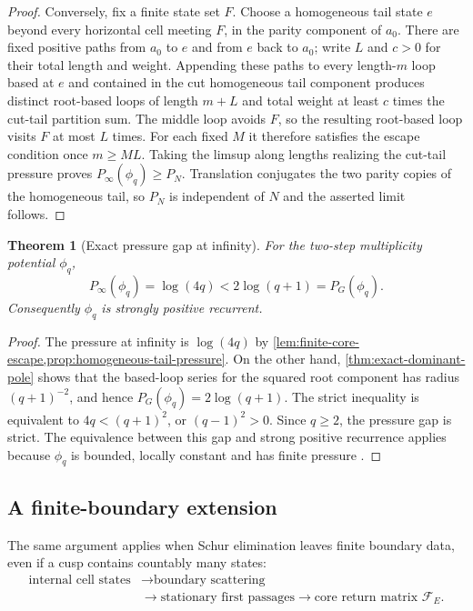\documentclass[11pt,reqno]{amsart}
\numberwithin{equation}{section}
\newtheorem{theorem}{Theorem}[section]
\theoremstyle{definition}
\theoremstyle{remark}
\newcommand{\cF}{\mathcal F}
\begin{document}
\begin{proof}
Conversely, fix a finite state set $F$.  Choose a homogeneous tail state $e$
beyond every horizontal cell meeting $F$, in the parity component of $a_0$.
There are fixed positive paths from $a_0$ to $e$ and from $e$ back to $a_0$;
write $L$ and $c>0$ for their total length and weight.  Appending these paths
to every length-$m$ loop based at $e$ and contained in the cut homogeneous
tail component produces distinct root-based loops of length $m+L$ and total
weight at least $c$ times the cut-tail partition sum.  The middle loop avoids
$F$, so the resulting root-based loop visits $F$ at most $L$ times.  For each
fixed $M$ it therefore satisfies the escape condition once $m\ge ML$.
Taking the limsup along lengths realizing the cut-tail pressure proves
$P_\infty(\phi_q)\ge P_N$.  Translation conjugates the two parity copies of
the homogeneous tail, so $P_N$ is independent of $N$ and the asserted limit
follows.
\end{proof}

\begin{theorem}[Exact pressure gap at infinity]
\label{thm:exact-pressure-gap}
For the two-step multiplicity potential $\phi_q$,
\begin{equation}\label{eq:exact-pressure-gap}
 P_\infty(\phi_q)=\log(4q)
 <2\log(q+1)=P_G(\phi_q).
\end{equation}
Consequently $\phi_q$ is strongly positive recurrent.
\end{theorem}

\begin{proof}
The pressure at infinity is $\log(4q)$ by
\cref{lem:finite-core-escape,prop:homogeneous-tail-pressure}.  On the other
hand, \cref{thm:exact-dominant-pole} shows that the based-loop series for the
squared root component has radius $(q+1)^{-2}$, and hence
$P_G(\phi_q)=2\log(q+1)$.  The strict inequality is equivalent to
$4q<(q+1)^2$, or $(q-1)^2>0$.  Since $q\ge2$, the pressure gap is strict.
The equivalence between this gap and strong positive recurrence applies
because $\phi_q$ is bounded, locally constant and has finite pressure
\cite{RuhrSarig2022,Velozo2026}.
\end{proof}

\subsection{A finite-boundary extension}
\label{sec:stationary-general}

The same argument applies when Schur elimination leaves finite boundary data,
even if a cusp contains countably many states:
\[
 \begin{aligned}
 \text{internal cell states}
 &\longrightarrow \text{boundary scattering}\\
 &\longrightarrow \text{stationary first passages}
 \longrightarrow \text{core return matrix }\cF_E.
 \end{aligned}
\]
\end{document}
